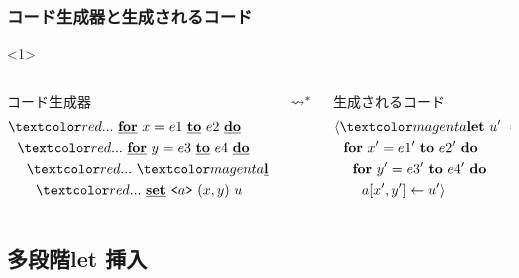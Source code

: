\begin{frame}
  \frametitle{コード生成器と生成されるコード}

  \begin{onlyenv}<1>
    \begin{columns}
      \begin{column}{0.5\textwidth}%
        コード生成器
        \begin{align*}
          & \red{...}~ \cfordo{x = e1}{e2} \\
          & ~~\red{...}~ \cfordo{y = e3}{e4} \\
          & ~~~~\red{...}~ \magenta{\cLet~u=t~\cIn} \\
          & ~~~~~~\red{...}~ \caryset{\code{a}}{(x,y)} u
        \end{align*}
      \end{column}
      $\leadsto^*$
      \begin{column}{0.5\textwidth}%
        生成されるコード
        \begin{align*}
          & \langle \magenta{\Let ~u' ~= ~t' ~\In} \\
          & ~~\fordo{x' = e1'}{e2'} \\
          & ~~~~\fordo{y' = e3'}{e4'} \\
          & ~~~~~~\aryset{a}{x',y'}{u'} \rangle
        \end{align*}
      \end{column}
    \end{columns}
  \end{onlyenv}
\end{frame}



\subsection{多段階let 挿入}

